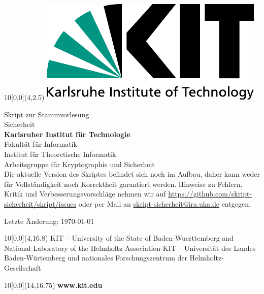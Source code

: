 \newcommand{\diameter}{20}
\newcommand{\xone}{-15}
\newcommand{\xtwo}{160}
\newcommand{\yone}{15}
\newcommand{\ytwo}{-253}

\begin{titlepage}



\begin{textblock}{10}[0,0](4,2.5)
  \includegraphics[width=.3\textwidth]{logos/KITLogo.pdf}
\end{textblock}
\vspace*{3cm}
\begin{center}
  \LARGE{Skript zur Stammvorlesung}
  \vspace*{1.5cm}\\
  \Huge{Sicherheit}\\
  \vspace*{3cm}
  \Large{\textbf{Karlsruher Institut für Technologie}\\
  \vspace*{6mm}
  Fakultät für Informatik\\
  \vspace*{4mm}
  Institut für Theoretische Informatik\\
  Arbeitsgruppe für Kryptographie und Sicherheit}\\
  
  \vspace*{2cm}
  Die aktuelle Version des Skriptes befindet sich noch im Aufbau, daher kann weder für Vollständigkeit noch Korrektheit garantiert werden. Hinweise zu Fehlern, Kritik und Verbesserungsvorschläge nehmen wir auf \url{https://github.com/skript-sicherheit/skript/issues} oder per Mail an \url{skript-sicherheit@ira.uka.de} entgegen.
  
  \vspace*{2cm}
  Letzte Änderung: \today
\end{center}


\begin{textblock}{10}[0,0](4,16.8)
\tiny{
  {KIT -- University of the State of Baden-Wuerttemberg and National Laboratory of the Helmholtz Association}
  {KIT -- Universität des Landes Baden-Würtemberg und nationales Forschungszentrum der Helmholtz-Gesellschaft}
}
\end{textblock}

\begin{textblock}{10}[0,0](14,16.75)
\large{
  \textbf{www.kit.edu}
}
\end{textblock}

\end{titlepage}

